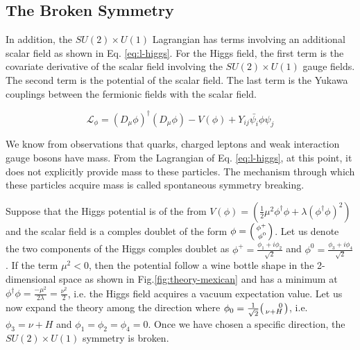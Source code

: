 \label{sec:theory-higgs}
\subsection{The Broken Symmetry}

In addition, the $SU(2)\times U(1)$ Lagrangian has terms involving an additional scalar field as shown in Eq. \ref{eq:l-higgs}. For the Higgs field, the first term is the covariate derivative of the scalar field involving the $SU(2)\times U(1)$ gauge fields. The second term is the potential of the scalar field. The last term is the Yukawa couplings between the fermionic fields with the scalar field. 

\begin{equation}
  \mathcal{L}_{\phi} = (D_{\mu}\phi)^{\dagger}(D_{\mu}\phi)-V(\phi)+Y_{ij}\bar{\psi_i}\phi\psi_j
  \label{eq:l-higgs}
\end{equation}

We know from observations that quarks, charged leptons and weak interaction gauge bosons have mass. From the Lagrangian of Eq. \ref{eq:l-higgs}, at this point, it does not explicitly provide mass to these particles. The mechanism through which these particles acquire mass is called spontaneous symmetry breaking.

Suppose that the Higgs potential is of the from $V(\phi)=(\frac{1}{2}\mu^2\phi^{\dagger}\phi+\lambda(\phi^{\dagger}\phi )^2)$ and the scalar field is a comples doublet of the form $\phi = \begin{psmallmatrix*}[r] \phi^+ \\ \phi^0 \end{psmallmatrix*} $. Let us denote the two components of the Higgs comples doublet as $\phi^+ = \frac{\phi_1+i\phi_2}{\sqrt{2}}$ and $\phi^0 = \frac{\phi_3+i\phi_4}{\sqrt{2}}$. If the term $\mu^2<0$, then the potential follow a wine bottle shape in the 2-dimensional space as shown in Fig.\ref{fig:theory-mexican} and has a minimum at $\phi^{\dagger}\phi = \frac{-\mu^2}{2\lambda} = \frac{\nu^2}{2}$, i.e. the Higgs field acquires a vacuum expectation value. Let us now expand the theory among the direction where $\phi_0 = \frac{1}{\sqrt{2}}\begin{psmallmatrix*}[r]0\\ \nu+H \end{psmallmatrix*}$, i.e. $\phi_3=\nu+H$ and  $\phi_1=\phi_2=\phi_4 = 0$. Once we have chosen a specific direction, the $SU(2)\times U(1)$ symmetry is broken.


